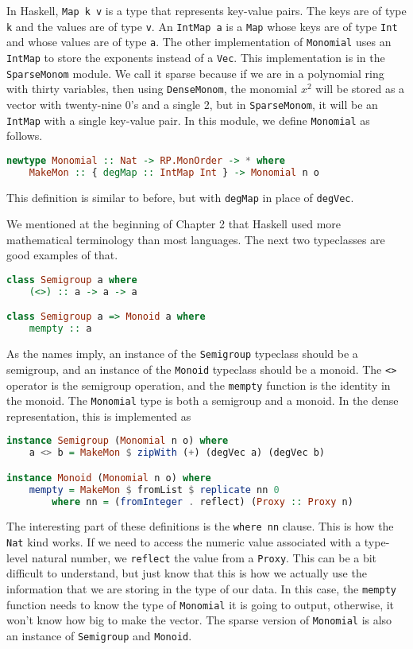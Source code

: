 \documentclass[MS, xcolor=dvipsnames]{wfuthesis}
\theoremstyle{definition}
\begin{document}
In Haskell, \lstinline{Map k v} is a type that represents key-value pairs. The keys are of type \lstinline{k} and the values are of type \lstinline{v}. An \lstinline{IntMap a} is a \lstinline{Map} whose keys are of type \lstinline{Int} and whose values are of type \lstinline{a}. The other implementation of \lstinline{Monomial} uses an \lstinline{IntMap} to store the exponents instead of a \lstinline{Vec}. This implementation is in the \lstinline{SparseMonom} module. We call it sparse because if we are in a polynomial ring with thirty variables, then using \lstinline{DenseMonom}, the monomial $x^2$ will be stored as a vector with twenty-nine 0's and a single 2, but in \lstinline{SparseMonom}, it will be an \lstinline{IntMap} with a single key-value pair. In this module, we define \lstinline{Monomial} as follows.
\begin{lstlisting}[language=Haskell]
newtype Monomial :: Nat -> RP.MonOrder -> * where
    MakeMon :: { degMap :: IntMap Int } -> Monomial n o
\end{lstlisting}
This definition is similar to before, but with \lstinline{degMap} in place of \lstinline{degVec}. \par
We mentioned at the beginning of Chapter 2 that Haskell used more mathematical terminology than most languages. The next two typeclasses are good examples of that.
\begin{lstlisting}[language=Haskell]
class Semigroup a where
    (<>) :: a -> a -> a

class Semigroup a => Monoid a where
    mempty :: a
\end{lstlisting}
As the names imply, an instance of the \lstinline{Semigroup} typeclass should be a semigroup, and an instance of the \lstinline{Monoid} typeclass should be a monoid. The \lstinline{<>} operator is the semigroup operation, and the \lstinline{mempty} function is the identity in the monoid. The \lstinline{Monomial} type is both a semigroup and a monoid. In the dense representation, this is implemented as
\begin{lstlisting}[language=Haskell]
instance Semigroup (Monomial n o) where
    a <> b = MakeMon $ zipWith (+) (degVec a) (degVec b)

instance Monoid (Monomial n o) where
    mempty = MakeMon $ fromList $ replicate nn 0
        where nn = (fromInteger . reflect) (Proxy :: Proxy n)
\end{lstlisting}
The interesting part of these definitions is the \lstinline{where nn} clause. This is how the \lstinline{Nat} kind works. If we need to access the numeric value associated with a type-level natural number, we \lstinline{reflect} the value from a \lstinline{Proxy}. This can be a bit difficult to understand, but just know that this is how we actually use the information that we are storing in the type of our data. In this case, the \lstinline{mempty} function needs to know the type of \lstinline{Monomial} it is going to output, otherwise, it won't know how big to make the vector. The sparse version of \lstinline{Monomial} is also an instance of \lstinline{Semigroup} and \lstinline{Monoid}.
\end{document}
